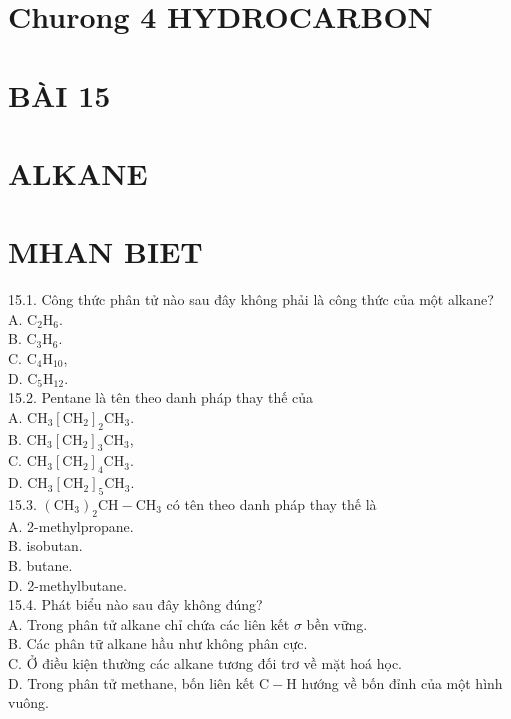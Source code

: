 \documentclass[10pt]{article}
\begin{document}
\section*{Churong 4 HYDROCARBON}
\section*{BÀI 15}
\section*{ALKANE}
\section*{MHAN BIET}
15.1. Công thức phân tử nào sau đây không phải là công thức của một alkane?\\
A. $\mathrm{C}_{2} \mathrm{H}_{6}$.\\
B. $\mathrm{C}_{3} \mathrm{H}_{6}$.\\
C. $\mathrm{C}_{4} \mathrm{H}_{10}$,\\
D. $\mathrm{C}_{5} \mathrm{H}_{12}$.\\
15.2. Pentane là tên theo danh pháp thay thế của\\
A. $\mathrm{CH}_{3}\left[\mathrm{CH}_{2}\right]_{2} \mathrm{CH}_{3}$.\\
B. $\mathrm{CH}_{3}\left[\mathrm{CH}_{2}\right]_{3} \mathrm{CH}_{3}$,\\
C. $\mathrm{CH}_{3}\left[\mathrm{CH}_{2}\right]_{4} \mathrm{CH}_{3}$.\\
D. $\mathrm{CH}_{3}\left[\mathrm{CH}_{2}\right]_{5} \mathrm{CH}_{3}$.\\
15.3. $\left(\mathrm{CH}_{3}\right)_{2} \mathrm{CH}-\mathrm{CH}_{3}$ có tên theo danh pháp thay thế là\\
A. 2-methylpropane.\\
B. isobutan.\\
B. butane.\\
D. 2-methylbutane.\\
15.4. Phát biểu nào sau đây không đúng?\\
A. Trong phân tử alkane chỉ chứa các liên kết $\sigma$ bền vững.\\
B. Các phân tữ alkane hầu như không phân cực.\\
C. Ở điều kiện thường các alkane tương đối trơ về mặt hoá học.\\
D. Trong phân tử methane, bốn liên kết $\mathrm{C}-\mathrm{H}$ hướng về bốn đỉnh của một hình vuông.\\
\end{document}
